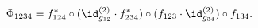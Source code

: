 \begin{equation}
  \Phi_{1234}
  = f^\ast_{124}
    \circ(\id^{(2)}_{g_{12}}\cdot f^\ast_{234})
    \circ(f_{123}\cdot\id^{(2)}_{g_{34}})
    \circ f_{134}.
\end{equation}

